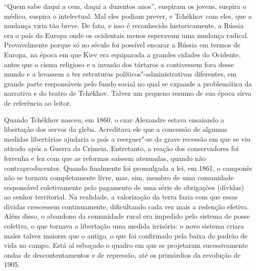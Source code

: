 ``Quem sabe daqui a cem, daqui a duzentos anos'', suspiram os
jovens, suspira o médico, suspira o intelectual. Mal eles podiam
prever, e Tchékhov com eles, que a mudança viria tão breve. De
fato, e isso é reconhecido historicamente, a Rússia era o país
da Europa onde os ocidentais menos esperavam uma mudança radical.
Provavelmente porque só no século  foi possível encarar
a Rússia em termos de Europa, na época em que Kiev era equiparada
a grandes cidades do Ocidente, antes que o cisma religioso e a
invasão dos tártaros a contivessem fora desse mundo e a levassem
a ter estruturas políticos"-administrativas diferentes, em grande
parte responsáveis pelo fundo social no qual se expande a problemática
da narrativa e do teatro de Tchékhov. Talvez um pequeno resumo de sua
época sirva de referência ao leitor.

Quando Tchékhov nasceu, em 1860, o czar Alexandre 
estava ensaiando a libertação dos servos da gleba. Acreditava ele
que a concessão de algumas medidas libertárias ajudaria o país a
reerguer"-se da grave recessão em que se viu atirado após a
Guerra da Crimeia. Entretanto, a reação dos conservadores foi
ferrenha e fez com que as reformas saíssem atenuadas, quando
não contraproducentes. Quando finalmente foi promulgada a lei, em
1861, o camponês não se tornava completamente livre, mas, sim,
membro de uma comunidade responsável coletivamente pelo pagamento
de uma série de obrigações (dívidas) ao senhor territorial. Na
realidade, a valorização da terra fazia com que essas dívidas
crescessem continuamente, dificultando cada vez mais a redenção
efetiva. Além disso, o abandono da comunidade rural era impedido
pelo sistema de posse coletiva, o que tornava a libertação uma
medida irrisória: o novo sistema criara males talvez maiores que
o antigo, o que foi confirmado pela baixa do padrão de vida no
campo. Está aí esboçado o quadro em que se projetaram sucessivamente
ondas de descontentamentos e de repressão, até os primórdios da revolução
de 1905.

